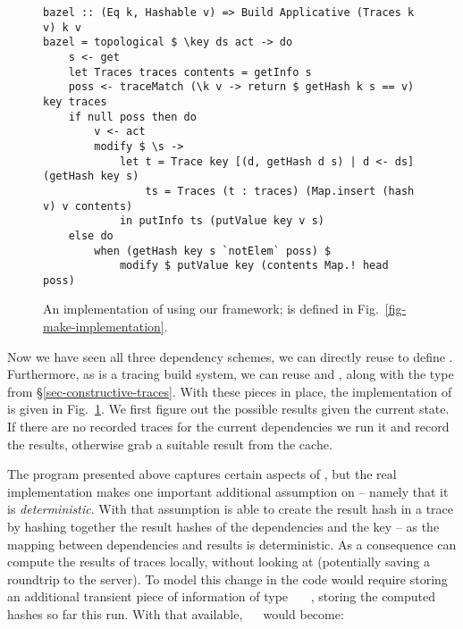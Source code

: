 \begin{figure}
\begin{verbatim}
bazel :: (Eq k, Hashable v) => Build Applicative (Traces k v) k v
bazel = topological $ \key ds act -> do
    s <- get
    let Traces traces contents = getInfo s
    poss <- traceMatch (\k v -> return $ getHash k s == v) key traces
    if null poss then do
        v <- act
        modify $ \s ->
            let t = Trace key [(d, getHash d s) | d <- ds] (getHash key s)
                ts = Traces (t : traces) (Map.insert (hash v) v contents)
            in putInfo ts (putValue key v s)
    else do
        when (getHash key s `notElem` poss) $
            modify $ putValue key (contents Map.! head poss)
\end{verbatim}
\vspace{-2mm}
\caption{An implementation of \Bazel using our framework;  is
defined in Fig.~\ref{fig-make-implementation}.}\label{fig-bazel-implementation}
\vspace{-2mm}
\end{figure}

Now we have seen all three dependency schemes, we can directly reuse  to define \Bazel. Furthermore, as \Bazel is a tracing build system, we can reuse  and , along with the  type from \S\ref{sec-constructive-traces}. With these pieces in place, the implementation of \Bazel is given in Fig.~\ref{fig-bazel-implementation}. We first figure out the possible results given the current state. If there are no recorded traces for the current dependencies we run it and record the results, otherwise grab a suitable result from the  cache.

The program presented above captures certain aspects of \Bazel, but the real implementation makes one important additional assumption on  -- namely that it is \textit{deterministic}. With that assumption \Bazel is able to create the result hash in a trace by hashing together the result hashes of the dependencies and the key -- as the mapping between dependencies and results is deterministic. As a consequence \Bazel can compute the results of traces locally, without looking at  (potentially saving a roundtrip to the server). To model this change in the code would require storing an additional transient piece of information  of type ~~~, storing the computed hashes so far this run. With that available, ~~ would become:

